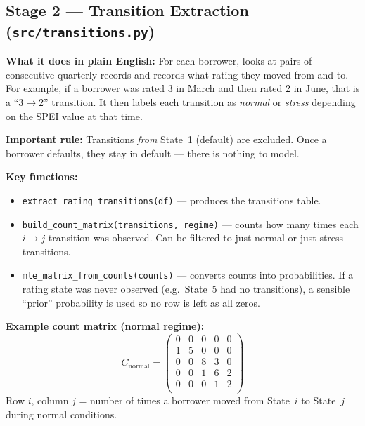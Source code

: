 \documentclass[12pt,a4paper]{article}
\begin{document}
\subsection{Stage 2 --- Transition Extraction (\texttt{src/transitions.py})}

\textbf{What it does in plain English:}
For each borrower, looks at pairs of consecutive quarterly records and records
what rating they moved from and to.  For example, if a borrower was rated 3
in March and then rated 2 in June, that is a ``$3 \to 2$'' transition.
It then labels each transition as \emph{normal} or \emph{stress} depending on
the SPEI value at that time.

\textbf{Important rule:} Transitions \emph{from} State~1 (default) are excluded.
Once a borrower defaults, they stay in default --- there is nothing to model.

\textbf{Key functions:}
\begin{itemize}[leftmargin=1.5em]
  \item \texttt{extract\_rating\_transitions(df)} --- produces the transitions
        table.
  \item \texttt{build\_count\_matrix(transitions, regime)} --- counts how many
        times each \( i \to j \) transition was observed.  Can be filtered to
        just normal or just stress transitions.
  \item \texttt{mle\_matrix\_from\_counts(counts)} --- converts counts into
        probabilities.  If a rating state was never observed (e.g.\ State~5 had
        no transitions), a sensible ``prior'' probability is used so no row is
        left as all zeros.
\end{itemize}

\textbf{Example count matrix (normal regime):}
\[
  C_{\text{normal}} =
  \begin{pmatrix}
    0 & 0 & 0 & 0 & 0 \\
    1 & 5 & 0 & 0 & 0 \\
    0 & 0 & 8 & 3 & 0 \\
    0 & 0 & 1 & 6 & 2 \\
    0 & 0 & 0 & 1 & 2 \\
  \end{pmatrix}
\]
Row $i$, column $j$ = number of times a borrower moved from State~$i$ to
State~$j$ during normal conditions.

\end{document}
